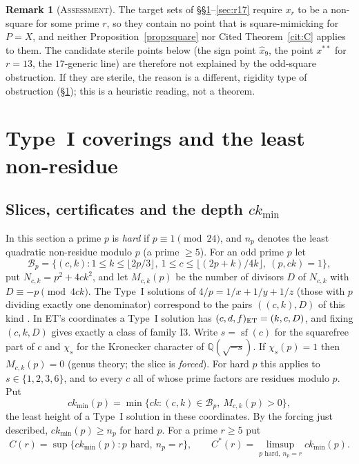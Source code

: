 \documentclass[11pt,reqno]{amsart}
\theoremstyle{definition}
\newtheorem{remark}[theorem]{Remark}
\newcommand{\Q}{\mathbb Q}
\newcommand{\sqf}{\operatorname{sf}}
\newcommand{\ckmin}{ck_{\min}}
\newcommand{\status}[1]{\textup{\textsc{#1}}}
\begin{document}
\begin{remark}[\status{Assessment}]\label{rem:notsquare}
The target sets of \S\S\ref{sec:typeI}--\ref{sec:r17} require $x_r$ to be a
non-square for some prime $r$, so they contain no point that is
square-mimicking for $P=X$, and neither Proposition~\ref{prop:square} nor
Cited Theorem~\ref{cit:C} applies to them.  The candidate sterile points
below (the sign point $\hat x_9$, the point $x^{**}$ for $r=13$, the
$17$-generic line) are therefore not explained by the odd-square
obstruction.  If they are sterile, the reason is a different, rigidity
type of obstruction (\S\ref{sec:typeI}); this is a heuristic reading,
not a theorem.
\end{remark}

\section{Type~I coverings and the least non-residue}\label{sec:typeI}

\subsection{Slices, certificates and the depth $\ckmin$}
In this section a prime $p$ is \emph{hard} if $p\equiv1\pmod{24}$, and
$n_p$ denotes the least quadratic non-residue modulo $p$ (a prime $\ge5$).
For an odd prime $p$ let
\[
\mathcal B_p=\{(c,k): 1\le k\le\lfloor 2p/3\rfloor,\ 1\le c\le
\lfloor (2p+k)/4k\rfloor,\ (p,ck)=1\},
\]
put $N_{c,k}=p^2+4ck^2$,
and let $M_{c,k}(p)$ be the number of divisors $D$ of $N_{c,k}$ with
$D\equiv-p\pmod{4ck}$.  The Type~I solutions of $4/p=1/x+1/y+1/z$ (those
with $p$ dividing exactly one denominator) correspond to the pairs
$((c,k),D)$ of this kind \cite[\S\S26, 36]{Notes}.  In ET's coordinates a Type~I
solution has $(c,d,f)_{\rm ET}=(k,c,D)$, and fixing $(c,k,D)$ gives
exactly a class of family I3.  Write $s=\sqf(c)$ for the squarefree part
of $c$ and $\chi_s$ for the Kronecker character of $\Q(\sqrt{-s})$.  If
$\chi_s(p)=1$ then $M_{c,k}(p)=0$ \cite[Thm.~48.1]{Notes} (genus theory;
the slice is \emph{forced}).  For hard $p$ this applies to
$s\in\{1,2,3,6\}$, and to every $c$ all of whose prime factors are
residues modulo $p$.  Put
\[
\ckmin(p)=\min\{ck:(c,k)\in\mathcal B_p,\ M_{c,k}(p)>0\},
\]
the least height of a Type~I solution in these coordinates.  By the
forcing just described, $\ckmin(p)\ge n_p$ for hard $p$.  For a prime
$r\ge5$ put
\[
C(r)=\sup\{\ckmin(p): p\text{ hard},\ n_p=r\},\qquad
C^*(r)=\limsup_{p\text{ hard},\ n_p=r}\ckmin(p).
\]
\end{document}
